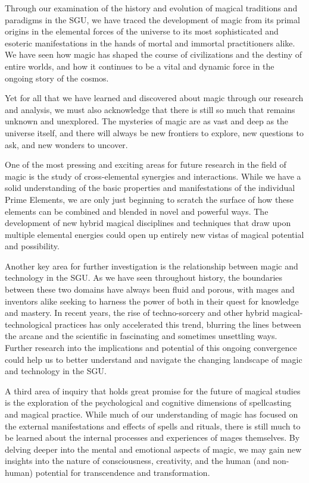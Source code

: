 \documentclass[12pt]{article}
\begin{document}
Through our examination of the history and evolution of magical traditions and paradigms in the SGU, we have traced the development of magic from its primal origins in the elemental forces of the universe to its most sophisticated and esoteric manifestations in the hands of mortal and immortal practitioners alike. We have seen how magic has shaped the course of civilizations and the destiny of entire worlds, and how it continues to be a vital and dynamic force in the ongoing story of the cosmos.

Yet for all that we have learned and discovered about magic through our research and analysis, we must also acknowledge that there is still so much that remains unknown and unexplored. The mysteries of magic are as vast and deep as the universe itself, and there will always be new frontiers to explore, new questions to ask, and new wonders to uncover.

One of the most pressing and exciting areas for future research in the field of magic is the study of cross-elemental synergies and interactions. While we have a solid understanding of the basic properties and manifestations of the individual Prime Elements, we are only just beginning to scratch the surface of how these elements can be combined and blended in novel and powerful ways. The development of new hybrid magical disciplines and techniques that draw upon multiple elemental energies could open up entirely new vistas of magical potential and possibility.

Another key area for further investigation is the relationship between magic and technology in the SGU. As we have seen throughout history, the boundaries between these two domains have always been fluid and porous, with mages and inventors alike seeking to harness the power of both in their quest for knowledge and mastery. In recent years, the rise of techno-sorcery and other hybrid magical-technological practices has only accelerated this trend, blurring the lines between the arcane and the scientific in fascinating and sometimes unsettling ways. Further research into the implications and potential of this ongoing convergence could help us to better understand and navigate the changing landscape of magic and technology in the SGU.

A third area of inquiry that holds great promise for the future of magical studies is the exploration of the psychological and cognitive dimensions of spellcasting and magical practice. While much of our understanding of magic has focused on the external manifestations and effects of spells and rituals, there is still much to be learned about the internal processes and experiences of mages themselves. By delving deeper into the mental and emotional aspects of magic, we may gain new insights into the nature of consciousness, creativity, and the human (and non-human) potential for transcendence and transformation.
\end{document}
